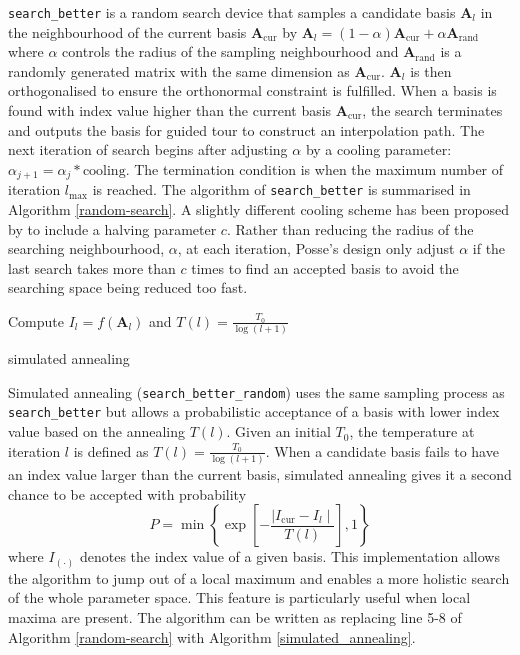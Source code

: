 \texttt{search\_better} is a random search device that samples a
candidate basis \(\mathbf{A}_{l}\) in the neighbourhood of the current
basis \(\mathbf{A}_{\text{cur}}\) by
\(\mathbf{A}_{l} = (1- \alpha)\mathbf{A}_{\text{cur}} + \alpha \mathbf{A}_{\text{rand}}\)
where \(\alpha\) controls the radius of the sampling neighbourhood and
\(\mathbf{A}_{\text{rand}}\) is a randomly generated matrix with the
same dimension as \(\mathbf{A}_{\text{cur}}\). \(\mathbf{A}_{l}\) is
then orthogonalised to ensure the orthonormal constraint is fulfilled.
When a basis is found with index value higher than the current basis
\(\mathbf{A}_{\text{cur}}\), the search terminates and outputs the basis
for guided tour to construct an interpolation path. The next iteration
of search begins after adjusting \(\alpha\) by a cooling parameter:
\(\alpha_{j+1} = \alpha_j * \text{cooling}\). The termination condition
is when the maximum number of iteration \(l_{\max}\) is reached. The
algorithm of \texttt{search\_better} is summarised in Algorithm
\ref{random-search}. A slightly different cooling scheme has been
proposed by \citet{posse1995projection} to include a halving parameter
\(c\). Rather than reducing the radius of the searching neighbourhood,
\(\alpha\), at each iteration, Posse's design only adjust \(\alpha\) if
the last search takes more than \(c\) times to find an accepted basis to
avoid the searching space being reduced too fast.

\begin{algorithm}
\SetAlgoLined
    Compute $I_{l} = f(\mathbf{A}_{l})$ and $T(l) = \frac{T_0}{\log(l + 1)}$\;
  \caption{simulated annealing}
  \label{simulated_annealing}
\end{algorithm}

Simulated annealing (\texttt{search\_better\_random})
\citep{kirkpatrick1983optimization, bertsimas1993simulated} uses the
same sampling process as \texttt{search\_better} but allows a
probabilistic acceptance of a basis with lower index value based on the
annealing \(T(l)\). Given an initial \(T_0\), the temperature at
iteration \(l\) is defined as \(T(l) = \frac{T_0}{\log(l + 1)}\). When a
candidate basis fails to have an index value larger than the current
basis, simulated annealing gives it a second chance to be accepted with
probability
\[P= \min\left\{\exp\left[-\frac{\mid I_{\text{cur}} - I_{l} \mid}{T(l)}\right],1\right\}\]
where \(I_{(\cdot)}\) denotes the index value of a given basis. This
implementation allows the algorithm to jump out of a local maximum and
enables a more holistic search of the whole parameter space. This
feature is particularly useful when local maxima are present. The
algorithm can be written as replacing line 5-8 of Algorithm
\ref{random-search} with Algorithm \ref{simulated_annealing}.

